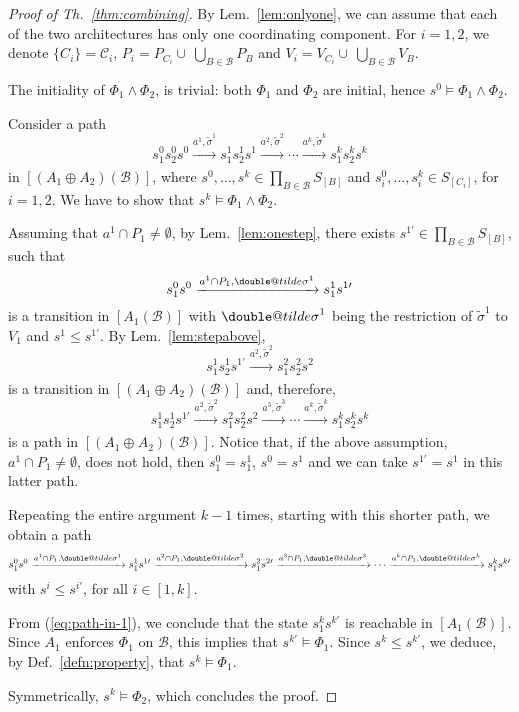 \documentclass{llncs}
\makeatletter
\newcommand{\defn}[1]{Def.~\ref{defn:#1}}
\newcommand{\eq}[1]{(\ref{eq:#1})}
\newcommand{\lem}[1]{Lem.~\ref{lem:#1}}
\newcommand{\thm}[1]{Th.~\ref{thm:#1}}
\newcommand{\cB}{\ensuremath{\mathcal{B}}}
\newcommand{\cC}{\ensuremath{\mathcal{C}}}
\newcommand{\goesto}[2][]{\ensuremath{\xrightarrow[#1]{#2}}}
\newcommand{\val}[3][]{\ensuremath{#1{\sigma}^{#2}_{#3}}}
\newcommand{\semopen}[1]{\ensuremath{[{#1}]}}
\newcommand{\arcomp}{\oplus}
\newcommand{\order}{\leqslant}
\newcommand{\doubletilde}[1]{{%
  \mathpalette\double@tilde{#1}%
}}
\newcommand{\double@tilde}[2]{%
  \sbox\z@{$\m@th#1\tilde{#2}$}%
  \ht\z@=.9\ht\z@
  \tilde{\box\z@}%
}
\makeatother
\begin{document}
\begin{proof}[Proof of \thm{combining}]
  By \lem{onlyone}, we can assume that each of the two
  architectures has only one coordinating component.  For $i =
  1,2$, we denote $\{C_i\} = \cC_i$, $P_i = P_{C_i}
  \cup\ \bigcup_{B \in \cB} P_B$ and $V_i = V_{C_i}
  \cup\ \bigcup_{B \in \cB} V_B$.
  
  The initiality of $\Phi_1 \land \Phi_2$, is trivial: both
  $\Phi_1$ and $\Phi_2$ are initial, hence $s^0 \models \Phi_1
  \land \Phi_2$.

  Consider a path
%
  \[
  s^0_1 s^0_2 s^0
%
  \goesto{a^1, \val[\tilde]{1}{}}
%
  s^1_1 s^1_2 s^1
%
  \goesto{a^2, \val[\tilde]{2}{}}
  \cdots
  \goesto{a^k, \val[\tilde]{k}{}}
%
  s^k_1 s^k_2 s^k
  \]
%
  in $\semopen{(A_1 \arcomp A_2)(\cB)}$, where
  $s^0,\dots,s^k \in \prod_{B \in \cB} S_{\semopen{B}}$ and
  $s^0_i,\dots, s^k_i \in S_{\semopen{C_i}}$, for $i=1,2$.
  We have to show that $s^k \models \Phi_1 \land \Phi_2$.

  Assuming that $a^1 \cap P_1 \neq \emptyset$, by \lem{onestep},
  there exists $s^{1\prime} \in \prod_{B \in \cB} S_{\semopen{B}}$,
  such that
%
  \[
  s^0_1 s^0
%
  \goesto{a^1 \cap P_1, \val[\doubletilde]{1}{}}
%
  s^1_1 s^{1\prime}
  \]
%
  is a transition in $\semopen{A_1(\cB)}$ with
  $\val[\doubletilde]{1}{}$ being the restriction of
  $\val[\tilde]{1}{}$ to $V_1$ and
  $s^1 \order s^{1\prime}$.
%
  By \lem{stepabove}, 
  \[
  s^1_1 s^1_2 s^{1\prime}
%
  \goesto{a^2, \val[\tilde]{2}{}}
%
  s^2_1 s^2_2 s^2
  \]
  is a transition in $\semopen{(A_1 \arcomp A_2)(\cB)}$ and,
  therefore, 
  \[
  s^1_1 s^1_2 s^{1\prime}
%
  \goesto{a^2, \val[\tilde]{2}{}}
%
  s^2_1 s^2_2 s^2
%
  \goesto{a^3, \val[\tilde]{3}{}}
  \cdots
  \goesto{a^k, \val[\tilde]{k}{}}
%
  s^k_1 s^k_2 s^k
  \]
%  
  is a path in $\semopen{(A_1 \arcomp A_2)(\cB)}$.
%
  Notice that, if the above assumption, $a^1 \cap P_1 \neq
  \emptyset$, does not hold, then $s^0_1 = s^1_1$, $s^0 = s^1$
  and we can take $s^{1\prime} = s^1$ in this latter path.

  Repeating the entire argument $k-1$ times, starting with this
  shorter path, we obtain a path
%
  \begin{equation}
    \label{eq:path-in-1}
    s^0_1 s^0
    \goesto{a^1 \cap P_1, \val[\doubletilde]{1}{}}
    s^1_1 s^{1\prime}
    \goesto{a^2 \cap P_1, \val[\doubletilde]{2}{}}
    s^2_1 s^{2\prime}
    \goesto{a^3 \cap P_1, \val[\doubletilde]{3}{}}
    \cdots
    \goesto{a^k \cap P_1, \val[\doubletilde]{k}{}}
    s^k_1 s^{k\prime}
  \end{equation}
%  
  with $s^i \order s^{i\prime}$, for all $i \in [1,k]$.

  From \eq{path-in-1}, we conclude that the state $s^k_1
  s^{k\prime}$ is reachable in $\semopen{A_1(\cB)}$.  Since $A_1$
  enforces $\Phi_1$ on $\cB$, this implies that $s^{k\prime}
  \models \Phi_1$.  Since $s^k \order s^{k\prime}$, we deduce, by
  \defn{property}, that $s^k \models \Phi_1$.

  Symmetrically, $s^k \models \Phi_2$, which concludes
  the proof.
\end{proof}
\end{document}
